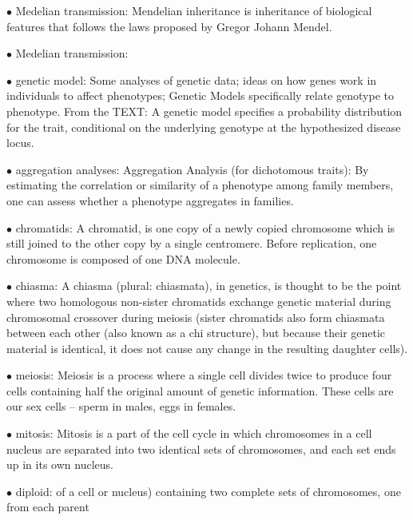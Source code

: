 \documentclass{article}
\begin{document}
\vspace{0.1in}
$\bullet$ Medelian transmission:
Mendelian inheritance is inheritance of biological features that follows the laws proposed by Gregor Johann Mendel.


\vspace{0.1in}
$\bullet$ Medelian transmission:


\vspace{0.1in}
$\bullet$ genetic model:
Some analyses of genetic data; ideas on how genes work in individuals to affect phenotypes;
Genetic Models specifically relate genotype to phenotype.
From the TEXT: A genetic model specifies a probability distribution for the trait, conditional on the underlying genotype at the hypothesized disease locus.


\vspace{0.1in}
$\bullet$ aggregation analyses:
Aggregation Analysis (for dichotomous traits): By estimating the correlation or
similarity of a phenotype among family members, one can assess whether a phenotype
aggregates in families.


\vspace{0.1in}
$\bullet$ chromatids:
A chromatid, is one copy of a newly copied chromosome which is still joined to the other copy by a single centromere. Before replication, one chromosome is composed of one DNA molecule.


\vspace{0.1in}
$\bullet$ chiasma:
A chiasma (plural: chiasmata), in genetics, is thought to be the point where two homologous non-sister chromatids exchange genetic material during chromosomal crossover during meiosis (sister chromatids also form chiasmata between each other (also known as a chi structure), but because their genetic material is identical, it does not cause any change in the resulting daughter cells). 


\vspace{0.1in}
$\bullet$ meiosis:
Meiosis is a process where a single cell divides twice to produce four cells containing half the original amount of genetic information. These cells are our sex cells – sperm in males, eggs in females.


\vspace{0.1in}
$\bullet$ mitosis:
Mitosis is a part of the cell cycle in which chromosomes in a cell nucleus are separated into two identical sets of chromosomes, and each set ends up in its own nucleus.


\vspace{0.1in}
$\bullet$ diploid:
of a cell or nucleus) containing two complete sets of chromosomes, one from each parent
\end{document}

